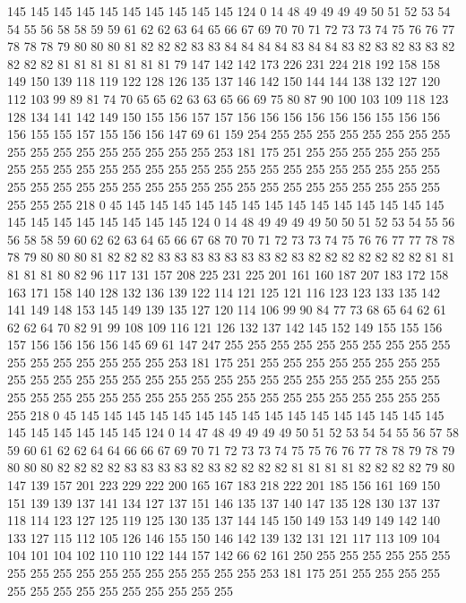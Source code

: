145 145 145 145 145 145 145 145 145 145 124 0 14 48 49 49 49 49 50 51
52 53 54 54 55 56 58 58 59 59 61 62 62 63 64 65 66 67 69 70
70 71 72 73 73 74 75 76 76 77 78 78 78 79 80 80 80 81 82 82
82 83 83 84 84 84 84 83 84 84 83 82 83 82 83 83 82 82 82 82
81 81 81 81 81 81 81 79 147 142 142 173 226 231 224 218 192 158 158 149
150 139 118 119 122 128 126 135 137 146 142 150 144 144 138 132 127 120 112 103
99 89 81 74 70 65 65 62 63 63 65 66 69 75 80 87 90 100 103 109
118 123 128 134 141 142 149 150 155 156 157 157 156 156 156 156 156 156 155 156
156 156 155 155 157 155 156 156 147 69 61 159 254 255 255 255 255 255 255 255
255 255 255 255 255 255 255 255 255 255 253 181 175 251 255 255 255 255 255 255
255 255 255 255 255 255 255 255 255 255 255 255 255 255 255 255 255 255 255 255
255 255 255 255 255 255 255 255 255 255 255 255 255 255 255 255 255 255 255 255
255 218 0 45 145 145 145 145 145 145 145 145 145 145 145 145 145 145 145 145
145 145 145 145 145 145 124 0 14 48 49 49 49 49 50 50 51 52 53 54
55 56 56 58 58 59 60 62 62 63 64 65 66 67 68 70 70 71 72 73
73 74 75 76 76 77 77 78 78 78 79 80 80 80 81 82 82 82 83 83
83 83 83 83 83 82 83 82 82 82 82 82 82 82 81 81 81 81 81 80
82 96 117 131 157 208 225 231 225 201 161 160 187 207 183 172 158 163 171 158
140 128 132 136 139 122 114 121 125 121 116 123 123 133 135 142 141 149 148 153
145 149 139 135 127 120 114 106 99 90 84 77 73 68 65 64 62 61 62 62
64 70 82 91 99 108 109 116 121 126 132 137 142 145 152 149 155 155 156 157
156 156 156 156 145 69 61 147 247 255 255 255 255 255 255 255 255 255 255 255
255 255 255 255 255 255 253 181 175 251 255 255 255 255 255 255 255 255 255 255
255 255 255 255 255 255 255 255 255 255 255 255 255 255 255 255 255 255 255 255
255 255 255 255 255 255 255 255 255 255 255 255 255 255 255 255 255 218 0 45
145 145 145 145 145 145 145 145 145 145 145 145 145 145 145 145 145 145 145 145
145 145 124 0 14 47 48 49 49 49 49 50 51 52 53 54 54 55 56 57
58 59 60 61 62 62 64 64 66 66 67 69 70 71 72 73 73 74 75 75
76 76 77 78 78 79 78 79 80 80 80 82 82 82 82 83 83 83 83 82
83 82 82 82 82 81 81 81 81 82 82 82 82 79 80 147 139 157 201 223
229 222 200 165 167 183 218 222 201 185 156 161 169 150 151 139 139 137 141 134
127 137 151 146 135 137 140 147 135 128 130 137 137 118 114 123 127 125 119 125
130 135 137 144 145 150 149 153 149 149 142 140 133 127 115 112 105 126 146 155
150 146 142 139 132 131 121 117 113 109 104 104 101 104 102 110 110 122 144 157
142 66 62 161 250 255 255 255 255 255 255 255 255 255 255 255 255 255 255 255
255 255 253 181 175 251 255 255 255 255 255 255 255 255 255 255 255 255 255 255
